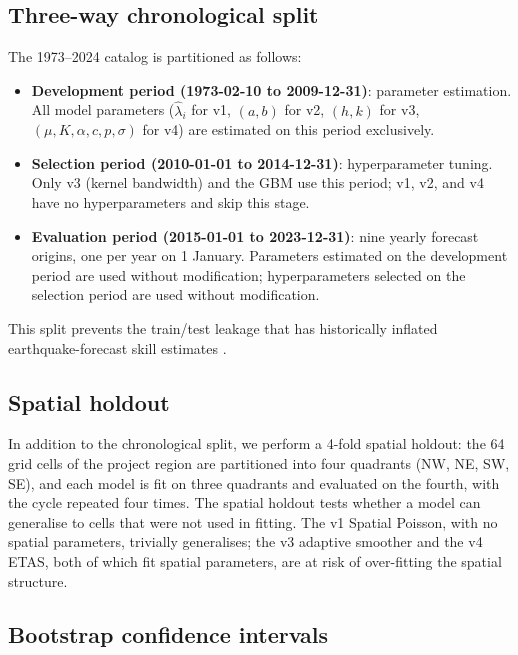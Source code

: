 \documentclass[10pt,a4paper,twocolumn]{article}
\begin{document}
\subsection{Three-way chronological split}

The 1973--2024 catalog is partitioned as follows:

\begin{itemize}[leftmargin=1.2em,itemsep=2pt,topsep=2pt]
\item \textbf{Development period (1973-02-10 to 2009-12-31)}: parameter estimation. All model parameters ($\hat\lambda_i$ for v1, $(a,b)$ for v2, $(h,k)$ for v3, $(\mu,K,\alpha,c,p,\sigma)$ for v4) are estimated on this period exclusively.
\item \textbf{Selection period (2010-01-01 to 2014-12-31)}: hyperparameter tuning. Only v3 (kernel bandwidth) and the GBM use this period; v1, v2, and v4 have no hyperparameters and skip this stage.
\item \textbf{Evaluation period (2015-01-01 to 2023-12-31)}: nine yearly forecast origins, one per year on 1 January. Parameters estimated on the development period are used without modification; hyperparameters selected on the selection period are used without modification.
\end{itemize}

This split prevents the train/test leakage that has historically inflated earthquake-forecast skill estimates \cite{marzocchi2012}.

\subsection{Spatial holdout}

In addition to the chronological split, we perform a 4-fold spatial holdout: the 64 grid cells of the project region are partitioned into four quadrants (NW, NE, SW, SE), and each model is fit on three quadrants and evaluated on the fourth, with the cycle repeated four times. The spatial holdout tests whether a model can generalise to cells that were not used in fitting. The v1 Spatial Poisson, with no spatial parameters, trivially generalises; the v3 adaptive smoother and the v4 ETAS, both of which fit spatial parameters, are at risk of over-fitting the spatial structure.

\subsection{Bootstrap confidence intervals}
\end{document}
